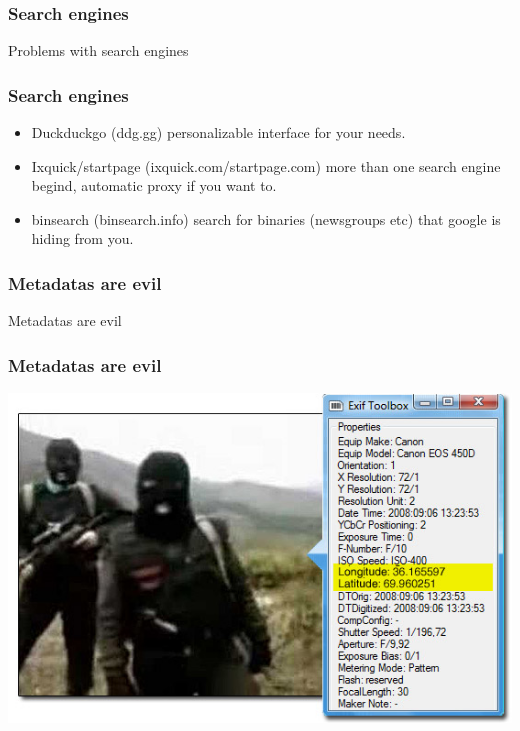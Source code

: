 \begin{frame}
\frametitle{Search engines}
\begin{center}
\huge{Problems with search engines}
\end{center}
\end{frame}

\begin{frame}
\frametitle{Search engines}
\begin{itemize}
\item Duckduckgo (ddg.gg) personalizable interface for your needs.
\item Ixquick/startpage (ixquick.com/startpage.com) more than one search engine
begind, automatic proxy if you want to.
\item binsearch (binsearch.info) search for binaries (newsgroups etc) that
google is hiding from you.
\end{itemize}
\end{frame}

\begin{frame}
\frametitle{Metadatas are evil}
\begin{center}
\huge{Metadatas are evil}
\end{center}
\end{frame}

\begin{frame}
\frametitle{Metadatas are evil}
\begin{center}
\includegraphics[scale=0.5] {./materials/exif-metadata.jpg} 
\end{center}
\end{frame}

